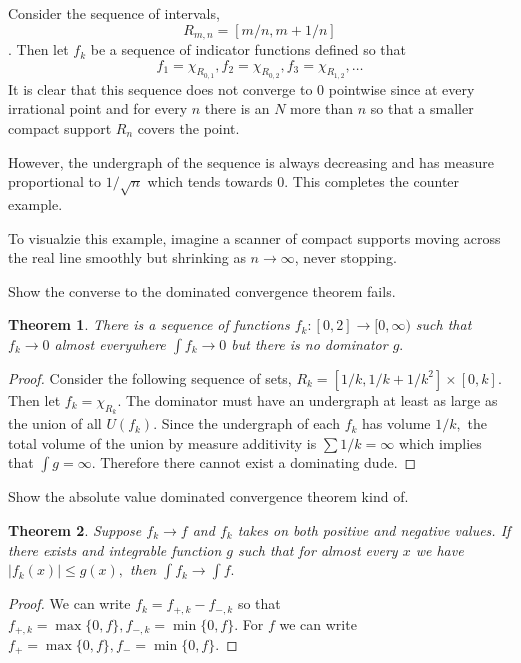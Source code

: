 \documentclass[letter]{article}
\newtheorem{theorem}{Theorem}
\newenvironment{menumerate}{%
  \edef\backupindent{\the\parindent}%
  \enumerate%
  \setlength{\parindent}{\backupindent}%
}{\endenumerate}
\begin{document}
\begin{menumerate}
     \item  Consider the sequence of intervals, 
     \begin{equation}
        R_{m,n} = [m/n, m+1/n]
     \end{equation}.
     Then let $f_k$ be a sequence of indicator functions defined so that
     \begin{equation}
        f_1 = \chi_{R_{0,1}}, f_2 = \chi_{R_{0,2}}, f_3 = \chi_{R_{1,2}}, \dots     
     \end{equation}
     It is clear that this sequence does not converge to $0$ pointwise since at every irrational point and for every $n$ there is an $N$ more than $n$ so that a smaller compact support $R_n$ covers the point. 

     However, the undergraph of the sequence is always decreasing and has measure proportional to $1/\sqrt{n}$ which tends towards $0$. This completes the counter example.

     To visualzie this example, imagine a scanner of compact supports moving across the real line smoothly but shrinking as $n \to \infty$, never stopping.
     \item Show the converse to the dominated convergence theorem fails.
     \begin{theorem}
        There is a sequence of functions $f_k : [0,2] \to [0, \infty)$ such that $f_k \to 0$ almost everywhere $\int f_k \to 0$
        but there is no dominator $g.$    
     \end{theorem}  
     \begin{proof}
        Consider the following sequence of sets, $R_k = [1/k, 1/k+1/k^2] \times [0,k]$. Then let $f_k = \chi_{R_k}.$
        The dominator must have an undergraph at least as large as the union of all $U(f_k).$ Since the undergraph of
        each $f_k$ has volume $1/k,$ the total volume of the union by measure additivity is $\sum 1/k = \infty$ which implies
        that $\int g = \infty.$ Therefore there cannot exist a dominating dude.
     \end{proof}
     \item Show the absolute value dominated convergence theorem kind of.
     \begin{theorem}
        Suppose $f_k \to f$ and $f_k$ takes on both positive and negative values. If there exists and integrable function $g$
        such that for almost every $x$ we have $|f_k(x)| \leq g(x),$ then $\int f_k \to \int f.$    
     \end{theorem}
     \begin{proof}
        We can write $f_k = f_{+,k} - f_{-,k}$ so that $f_{+,k} = \max \{0, f\}, f_{-,k} = \min \{0, f\}.$
        For $f$ we can write $f_+ = \max\{0,f\}, f_- = \min \{0, f\}.$ 


\end{proof}
\end{menumerate}
\end{document}
